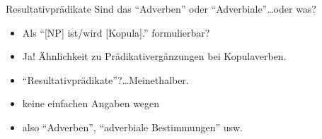 \begin{frame}
  {Resultativprädikate}
  \pause
  Sind das "`Adverben"' oder "`Adverbiale"'\ldots oder was?\\
  \Halbzeile
  \pause
  \begin{exe}
    \ex\label{ex:praedikative027}
    \begin{xlist}
    \end{xlist}
  \end{exe}
  \pause
  \begin{itemize}[<+->]
    \item Als \alert{"`[NP] ist\slash wird [Kopula]."'} formulierbar?
    \item \alert{Ja! Ähnlichkeit zu Prädikativergänzungen bei Kopulaverben.}
    \item "`Resultativprädikate"'?\ldots Meinethalber.
    \item keine einfachen Angaben wegen 
    \item also  "`Adverben"', "`adverbiale Bestimmungen"' usw.
  \end{itemize}
\end{frame}


